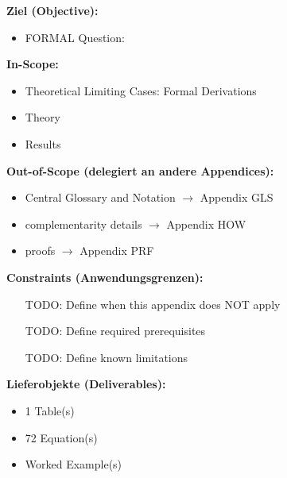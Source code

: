 

\begin{tcolorbox}[
    colback=orange!5!white,
    colframe=orange!75!black,
    title={\textbf{Appendix Scope: Ziel / In-Scope / Out-of-Scope / Constraints}},
    fonttitle=\bfseries
]

\textbf{Ziel (Objective):}
\begin{itemize}[nosep]
    \item FORMAL Question:
\end{itemize}

\textbf{In-Scope:}
\begin{itemize}[nosep]
    \item Theoretical Limiting Cases: Formal Derivations
    \item Theory
    \item Results
\end{itemize}

\textbf{Out-of-Scope (delegiert an andere Appendices):}
\begin{itemize}[nosep]
    \item Central Glossary and Notation $\rightarrow$ Appendix GLS
    \item complementarity details $\rightarrow$ Appendix HOW
    \item proofs $\rightarrow$ Appendix PRF
\end{itemize}

\textbf{Constraints (Anwendungsgrenzen):}
\begin{itemize}[nosep]
    \item [TODO: Define when this appendix does NOT apply]
    \item [TODO: Define required prerequisites]
    \item [TODO: Define known limitations]
\end{itemize}

\textbf{Lieferobjekte (Deliverables):}
\begin{itemize}[nosep]
    \item 1 Table(s)
    \item 72 Equation(s)
    \item Worked Example(s)
\end{itemize}

\end{tcolorbox}


